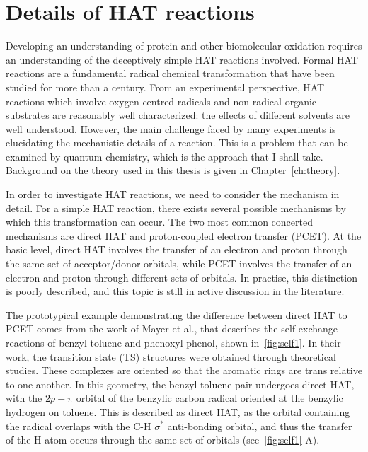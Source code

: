 \section{Details of HAT reactions}

Developing an understanding of protein and other biomolecular oxidation requires an understanding of the deceptively simple HAT reactions involved. Formal HAT reactions are a fundamental radical chemical transformation that have been studied for more than a century.\cite{Kochi1973, Parsons2000} From an experimental perspective, HAT reactions which involve oxygen-centred radicals and non-radical organic substrates are reasonably well characterized: the effects of different solvents are well understood.\cite{Litwinienko2007} However, the main challenge faced by many experiments is elucidating the mechanistic details of a reaction. This is a problem that can be examined by quantum chemistry, which is the approach that I shall take. Background on the theory used in this thesis is given in Chapter~\ref{ch:theory}.

In order to investigate HAT reactions, we need to consider the mechanism in detail. For a simple HAT reaction, there exists several possible mechanisms by which this transformation can occur. The two most common concerted mechanisms are direct HAT and proton-coupled electron transfer (PCET). At the basic level, direct HAT involves the transfer of an electron and proton through the same set of acceptor/donor orbitals, while PCET involves the transfer of an electron and proton through different sets of orbitals. In practise, this distinction is poorly described, and this topic is still in active discussion in the literature.\cite{Cukier1998, Mayer2002, Stubbe2003, Mayer2004, DiLabio2007, Huynh2007, HammesSchiffer2008, Mayer2010, Weinberg2012, HammesSchiffer2015, MunozRugeles2017}

The prototypical example demonstrating the difference between direct HAT to PCET comes from the work of Mayer et al.,\cite{Mayer2002} that describes the self-exchange reactions of benzyl-toluene and phenoxyl-phenol, shown in~\ref{fig:self1}. In their work, the transition state (TS) structures were obtained through theoretical studies. These complexes are oriented so that the aromatic rings are trans relative to one another. In this geometry, the benzyl-toluene pair undergoes direct HAT, with the $2p-\pi$ orbital of the benzylic carbon radical oriented at the benzylic hydrogen on toluene. This is described as direct HAT, as the orbital containing the radical overlaps with the C-H $\sigma^*$ anti-bonding orbital, and thus the transfer of the H atom occurs through the same set of orbitals (see~\ref{fig:self1} A).

